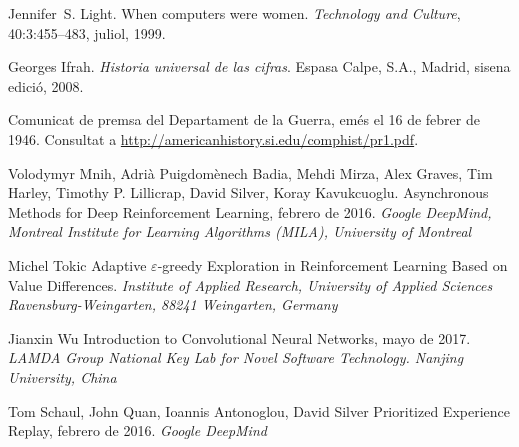 \documentclass[11pt,spanish,listoffigures,listoftables]{tfgetsinf}
\begin{document}
\begin{thebibliography}{10}

   Jennifer~S. Light.
   \newblock When computers were women.
   \newblock \textit{Technology and Culture}, 40:3:455--483, juliol, 1999.

   Georges Ifrah.
   \newblock \textit{Historia universal de las cifras}.
   \newblock Espasa Calpe, S.A., Madrid, sisena edició, 2008.

   Comunicat de premsa del Departament de la Guerra, 
   emés el 16 de febrer de 1946. 
   \newblock Consultat a 
   \url{http://americanhistory.si.edu/comphist/pr1.pdf}.
   
	Volodymyr Mnih, Adrià Puigdomènech Badia, Mehdi Mirza, Alex Graves, Tim Harley, Timothy P. Lillicrap, David Silver, Koray Kavukcuoglu.
	\newblock Asynchronous Methods for Deep Reinforcement Learning,
	febrero de 2016.
	\newblock \textit {Google DeepMind, Montreal Institute for Learning Algorithms (MILA), University of Montreal}
	
	Michel Tokic
	\newblock Adaptive $\varepsilon$-greedy Exploration in Reinforcement Learning Based on Value Differences.
	\newblock \textit {Institute of Applied Research, University of Applied Sciences Ravensburg-Weingarten, 88241 Weingarten, Germany}
	
	Jianxin Wu
	\newblock Introduction to Convolutional Neural Networks,
	mayo de 2017.
	\newblock \textit {LAMDA Group \newblock National Key Lab for Novel Software Technology. Nanjing University, China}
	
	Tom Schaul, John Quan, Ioannis Antonoglou, David Silver
	\newblock Prioritized Experience Replay,
	febrero de 2016.
	\newblock \textit {Google DeepMind}

\end{thebibliography}
\cleardoublepage
\end{document}
